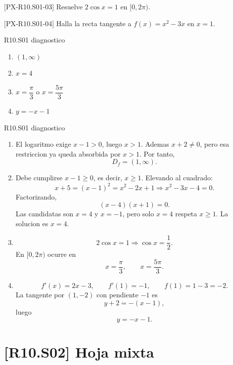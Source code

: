 \begin{exercise}{[PX-R10.S01-03] Resuelve \(2\cos x=1\) en \([0,2\pi)\).}
\end{exercise}

\begin{exercise}{[PX-R10.S01-04] Halla la recta tangente a \(f(x)=x^2-3x\) en \(x=1\).}
\end{exercise}

\begin{shortanswer}{R10.S01 diagnostico}
\begin{enumerate}[label=\textbf{PX-R10.S01-\arabic*:}, leftmargin=*]
  \item \((1,\infty)\)
  \item \(x=4\)
  \item \(x=\dfrac{\pi}{3}\) o \(x=\dfrac{5\pi}{3}\)
  \item \(y=-x-1\)
\end{enumerate}
\end{shortanswer}

\begin{fullsolution}{R10.S01 diagnostico}
\begin{enumerate}[label=\textbf{PX-R10.S01-\arabic*:}, leftmargin=*]
  \item El logaritmo exige \(x-1>0\), luego \(x>1\). Ademas \(x+2\neq 0\), pero esa restriccion
  ya queda absorbida por \(x>1\). Por tanto,
  \[
  D_f=(1,\infty).
  \]
  \item Debe cumplirse \(x-1\geq 0\), es decir, \(x\geq 1\). Elevando al cuadrado:
  \[
  x+5=(x-1)^2=x^2-2x+1
  \Longrightarrow x^2-3x-4=0.
  \]
  Factorizando,
  \[
  (x-4)(x+1)=0.
  \]
  Las candidatas son \(x=4\) y \(x=-1\), pero solo \(x=4\) respeta \(x\geq 1\). La solucion es
  \(x=4\).
  \item
  \[
  2\cos x=1 \Longrightarrow \cos x=\frac{1}{2}.
  \]
  En \([0,2\pi)\) ocurre en
  \[
  x=\frac{\pi}{3},\qquad x=\frac{5\pi}{3}.
  \]
  \item
  \[
  f'(x)=2x-3,\qquad f'(1)=-1,\qquad f(1)=1-3=-2.
  \]
  La tangente por \((1,-2)\) con pendiente \(-1\) es
  \[
  y+2=-(x-1),
  \]
  luego
  \[
  y=-x-1.
  \]
\end{enumerate}
\end{fullsolution}

\section{[R10.S02] Hoja mixta}

